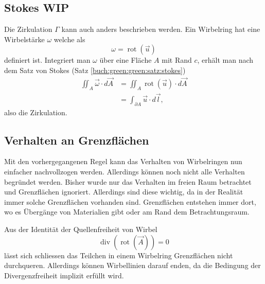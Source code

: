 \subsection{Stokes WIP \label{paper:Wirbelringe:Stokes}}

Die Zirkulation \(\Gamma\) kann auch anders beschrieben werden. 
Ein Wirbelring hat eine Wirbelstärke \(\omega\) welche als
\[
\omega
=
\operatorname{rot}\left( \vec{u} \right)
\]
definiert ist.
Integriert man $\omega$ über eine Fläche \(A\) mit Rand \(c\), erhält man nach dem Satz von Stokes (Satz \ref{buch:green:green:satz:stokes})
\begin{align*}
\iint_{A} \vec{\omega} \cdot d \vec{A}
&=
\iint_{A} \operatorname{rot}\left(\vec{u}\right)\cdot  d \vec{A}\\
&=
\int_{\partial A} \vec{u} \cdot d\vec{l},
\end{align*}
also die Zirkulation.

\subsection{Verhalten an Grenzflächen \label{paper:Wirbelringe:Grenzflaechen}}

Mit den vorhergegangenen Regel kann das Verhalten von Wirbelringen nun einfacher nachvollzogen werden. 
Allerdings können noch nicht alle Verhalten begründet werden. 
Bisher wurde nur das Verhalten im freien Raum betrachtet und Grenzflächen ignoriert. 
Allerdings sind diese wichtig, da in der Realität immer solche Grenzflächen vorhanden sind. 
Grenzflächen entstehen immer dort, wo es Übergänge von Materialien gibt oder am Rand dem Betrachtungsraum.

Aus der Identität der Quellenfreiheit von Wirbel 
\[
\operatorname{div} \left( \operatorname{rot} \left( \vec{A} \right) \right) 
= 
0
\]
lässt sich schliessen das Teilchen in einem Wirbelring Grenzflächen nicht durchqueren. 
Allerdings können Wirbellinien darauf enden, da die Bedingung der Divergenzfreiheit implizit erfüllt wird. 

